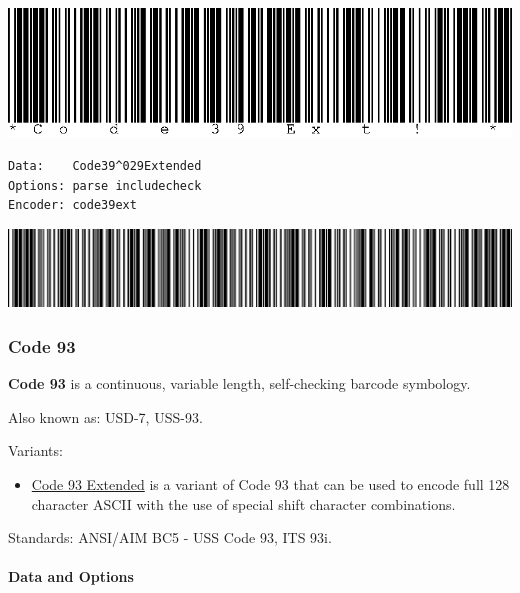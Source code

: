 \includegraphics{images/code39ext-1.eps}

\begin{verbatim}
Data:    Code39^029Extended
Options: parse includecheck
Encoder: code39ext
\end{verbatim}

\includegraphics{images/code39ext-2.eps}

\hypertarget{code-93}{%
\subsubsection{Code 93}\label{code-93}}

\textbf{Code 93} is a continuous, variable length, self-checking barcode
symbology.

Also known as: USD-7, USS-93.

Variants:

\begin{itemize}
\tightlist
\item
  \protect\hyperlink{code-93-extended}{Code 93 Extended} is a variant of
  Code 93 that can be used to encode full 128 character ASCII with the
  use of special shift character combinations.
\end{itemize}

Standards: ANSI/AIM BC5 - USS Code 93, ITS 93i.

\hypertarget{data-and-options-22}{%
\paragraph{Data and Options}\label{data-and-options-22}}

